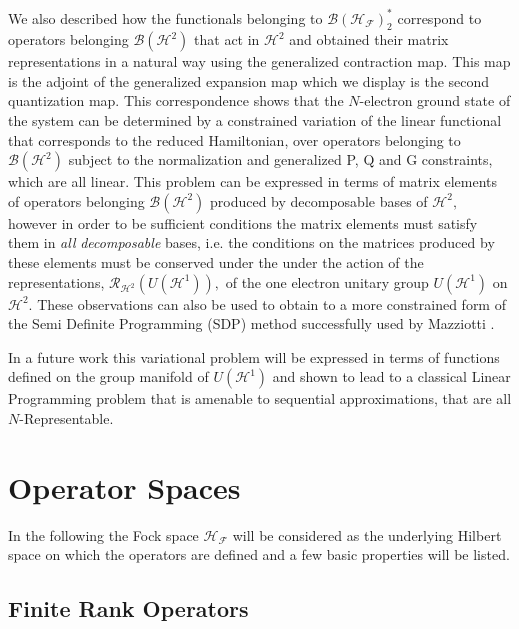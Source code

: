 \documentclass[aps,preprint,amsfonts,amssymb,showpacs,showkeys]{revtex4}%
\begin{document}
We also described how the functionals belonging to $\mathcal{B}\left(
\mathcal{H}_{\mathcal{F}}\right)  _{2}^{\ast}$ correspond to operators
belonging $\mathcal{B}\left(  \mathcal{H}^{2}\right)  $ that act in
$\mathcal{H}^{2}$ and obtained their matrix representations in a natural way
using the generalized contraction map. This map is the adjoint of the
generalized expansion map which we display is the second quantization map.
This correspondence shows that the $N$-electron ground state of the system can
be determined by a constrained variation of the linear functional that
corresponds to the reduced Hamiltonian, over operators belonging to
$\mathcal{B}\left(  \mathcal{H}^{2}\right)  $ subject to the normalization and
generalized P, Q and G constraints, which are all linear. This problem can be
expressed in terms of matrix elements of operators belonging $\mathcal{B}%
\left(  \mathcal{H}^{2}\right)  $ produced by decomposable bases of
$\mathcal{H}^{2},$ however in order to be sufficient conditions the matrix
elements must satisfy them in \emph{all} \emph{decomposable} bases, i.e. the
conditions on the matrices produced by these elements must be conserved under
the under the action of the representations, $\mathcal{R}_{\mathcal{H}^{2}%
}\left(  U\left(  \mathcal{H}^{1}\right)  \right)  ,$ of the one electron
unitary group $U\left(  \mathcal{H}^{1}\right)  $ on $\mathcal{H}^{2}.$ These
observations can also be used to obtain to a more constrained form of the Semi
Definite Programming (SDP) method successfully used by Mazziotti
\cite{Mazziotti2011}.

In a future work this variational problem will be expressed in terms of
functions defined on the group manifold of $U\left(  \mathcal{H}^{1}\right)  $
and shown to lead to a classical Linear Programming problem that is amenable
to sequential approximations, that are all $N$-Representable.

\appendix


\section{Operator Spaces \label{Operators}}

In the following the Fock space $\mathcal{H}_{\mathcal{F}}$ will be considered
as the underlying Hilbert space on which the operators are defined and a few
basic properties will be listed.

\subsection{Finite Rank Operators}
\end{document}
